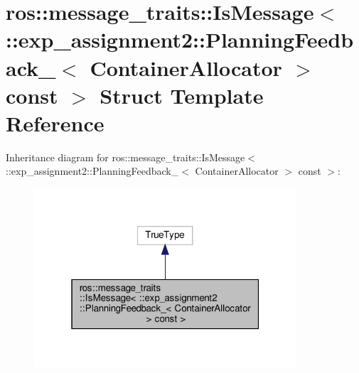 \hypertarget{structros_1_1message__traits_1_1IsMessage_3_01_1_1exp__assignment2_1_1PlanningFeedback___3_01Con6f73fda86f8a293b5e2668607393cfb4}{}\section{ros\+:\+:message\+\_\+traits\+:\+:Is\+Message$<$ \+:\+:exp\+\_\+assignment2\+:\+:Planning\+Feedback\+\_\+$<$ Container\+Allocator $>$ const $>$ Struct Template Reference}
\label{structros_1_1message__traits_1_1IsMessage_3_01_1_1exp__assignment2_1_1PlanningFeedback___3_01Con6f73fda86f8a293b5e2668607393cfb4}


Inheritance diagram for ros\+:\+:message\+\_\+traits\+:\+:Is\+Message$<$ \+:\+:exp\+\_\+assignment2\+:\+:Planning\+Feedback\+\_\+$<$ Container\+Allocator $>$ const $>$\+:
\nopagebreak
\begin{figure}[H]
\begin{center}
\leavevmode
\includegraphics[width=277pt]{structros_1_1message__traits_1_1IsMessage_3_01_1_1exp__assignment2_1_1PlanningFeedback___3_01Con2e4afbdaf329a315d7753156c22ab311}
\end{center}
\end{figure}


